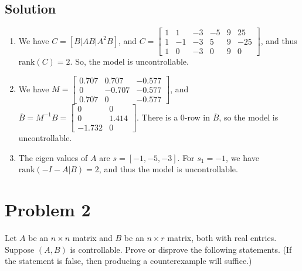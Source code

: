 \documentclass[11pt]{report}
\begin{document}
\subsection*{Solution}
\begin{enumerate}[label=\alph*)]
\item
We have $C = [B | AB | A^2B]$, and $C = \begin{bmatrix} 1 & 1 & -3 & -5 & 9 & 25\\  1 & -1 & -3 & 5 & 9 & -25\\  1 & 0 & -3 & 0 & 9 & 0 \end{bmatrix}$, and thus $\text{rank}(C) = 2$. So, the model is uncontrollable.
\item
We have $M = \begin{bmatrix} 0.707 & 0.707 & -0.577\\ 0 & -0.707 & -0.577\\ 0.707 & 0 & -0.577\end{bmatrix}$, and $\overline B = M^{-1} B = \begin{bmatrix} 0 & 0\\ 0 & 1.414\\ -1.732 & 0\end{bmatrix}$. There is a $0$-row in $\overline B$, so the model is uncontrollable.
\item
The eigen values of $A$ are $s = [-1, -5, -3]$. For $s_1 = -1$, we have $\text{rank}(-I - A|B) = 2$, and thus the model is uncontrollable.

\end{enumerate}

\pagebreak
\section*{Problem 2}

Let $A$ be an $n \times n$ matrix and $B$ be an $n \times r$ matrix, both with real entries. Suppose $(A,B)$ is controllable. Prove or disprove the following statements. (If the statement is false, then producing a counterexample will suffice.)
\end{document}
